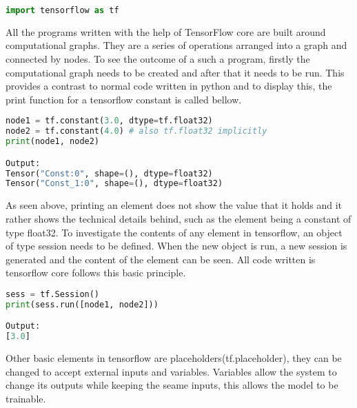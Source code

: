 \begin{lstlisting}[language=Python, caption=Importing Tensorflow library.]
import tensorflow as tf
\end{lstlisting}

All the programs written with the help of TensorFlow core are built around computational graphs. 
They are a series of operations arranged into a graph and connected by nodes. 
To see the outcome of a such a program, 
firstly the computational graph needs to be created and after that it needs to be run. 
This provides a contrast to normal code written in python and to display this, 
the print function for a tensorflow constant is called bellow.

\begin{lstlisting}[language=Python, caption=Printing output without sess.run().]
node1 = tf.constant(3.0, dtype=tf.float32)
node2 = tf.constant(4.0) # also tf.float32 implicitly
print(node1, node2)

Output:
Tensor("Const:0", shape=(), dtype=float32)
Tensor("Const_1:0", shape=(), dtype=float32) 
\end{lstlisting}

As seen above, printing an element does not show the value that it holds and it rather shows the technical details behind,
such as the element being a constant of type float32.
To investigate the contents of any element in tensorflow,
an object of type session needs to be defined.
When the new object is run, a new session is generated and the content of the element can be seen.
All code written is tensorflow core follows this basic principle.

\begin{lstlisting}[language=Python, caption=Printing output with sess.run().]
sess = tf.Session()
print(sess.run([node1, node2]))

Output:
[3.0]
\end{lstlisting}

Other basic elements in tensorflow are
placeholders(tf.placeholder), they can be changed to accept 
external inputs and variables. Variables allow the system to
change its outputs while keeping the seame inputs,
this allows the model to be trainable. 

